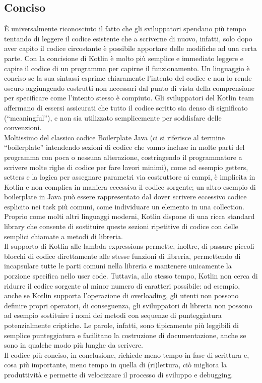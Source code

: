\subsection{Conciso}
È universalmente riconosciuto il fatto che gli sviluppatori spendano più tempo tentando di leggere il codice esistente che a scriverne di nuovo, infatti, solo dopo aver capito il codice circostante è possibile apportare delle modifiche ad una certa parte. Con la concisione di Kotlin è molto più semplice e immediato leggere e capire il codice di un programma per capirne il funzionamento. Un linguaggio è conciso se la sua sintassi esprime chiaramente l'intento del codice e non lo rende oscuro aggiungendo costrutti non necessari dal punto di vista della comprensione per specificare come l'intento stesso è compiuto. Gli sviluppatori del Kotlin team affermano di essersi assicurati che tutto il codice scritto sia denso di significato (“meaningful”), e non sia utilizzato semplicemente per soddisfare delle convenzioni.\\
Moltissimo del classico codice Boilerplate Java (ci si riferisce al termine “boilerplate” intendendo sezioni di codice che vanno incluse in molte parti del programma con poca o nessuna alterazione, costringendo il programmatore a scrivere molte righe di codice per fare lavori minimi), come ad esempio getters, setters e la logica per assegnare parametri via costruttore ai campi, è implicita in Kotlin e non complica in maniera eccessiva il codice sorgente; un altro esempio di boilerplate in Java può essere rappresentato dal dover scrivere eccessivo codice esplicito nei task più comuni, come individuare un elemento in una collection. Proprio come molti altri linguaggi moderni, Kotlin dispone di una ricca standard library che consente di sostituire queste sezioni ripetitive di codice con delle semplici chiamate a metodi di libreria.\\
Il supporto di Kotlin alle lambda expressions permette, inoltre, di passare piccoli blocchi di codice direttamente alle stesse funzioni di libreria, permettendo di incapsulare tutte le parti comuni nella libreria e mantenere unicamente la porzione specifica nello user code. Tuttavia, allo stesso tempo, Kotlin non cerca di ridurre il codice sorgente al minor numero di caratteri possibile: ad esempio, anche se Kotlin supporta l'operazione di overloading, gli utenti non possono definire propri operatori, di conseguenza, gli sviluppatori di libreria non possono ad esempio sostituire i nomi dei metodi con sequenze di punteggiatura potenzialmente criptiche. Le parole, infatti, sono tipicamente più leggibili di semplice punteggiatura e facilitano la costruzione di documentazione, anche se sono in qualche modo più lunghe da scrivere.\\
Il codice più conciso, in conclusione, richiede meno tempo in fase di scrittura e, cosa più importante, meno tempo in quella di (ri)lettura, ciò migliora la produttività e permette di velocizzare il processo di sviluppo e debugging.\\

